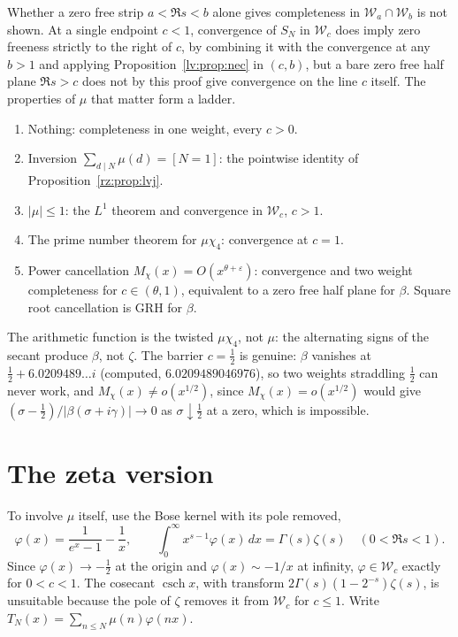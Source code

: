 Whether a zero free strip $a<\Re s<b$ alone gives completeness in $\mathcal W_a\cap\mathcal W_b$ is not shown. At a single endpoint $c<1$, convergence of $S_N$ in $\mathcal W_c$ does imply zero freeness strictly to the right of $c$, by combining it with the convergence at any $b>1$ and applying Proposition~\ref{lv:prop:nec} in $(c,b)$, but a bare zero free half plane $\Re s>c$ does not by this proof give convergence on the line $c$ itself. The properties of $\mu$ that matter form a ladder.
\begin{enumerate}
\item[(P0)] Nothing: completeness in one weight, every $c>0$.
\item[(P1)] Inversion $\sum_{d\mid N}\mu(d)=[N=1]$: the pointwise identity of Proposition~\ref{rz:prop:lvj}.
\item[(P2)] $|\mu|\le1$: the $L^1$ theorem and convergence in $\mathcal W_c$, $c>1$.
\item[(P3)] The prime number theorem for $\mu\chi_4$: convergence at $c=1$.
\item[(P4)] Power cancellation $M_\chi(x)=O(x^{\theta+\varepsilon})$: convergence and two weight completeness for $c\in(\theta,1)$, equivalent to a zero free half plane for $\beta$. Square root cancellation is GRH for $\beta$.
\end{enumerate}
The arithmetic function is the twisted $\mu\chi_4$, not $\mu$: the alternating signs of the secant produce $\beta$, not $\zeta$. The barrier $c=\frac12$ is genuine: $\beta$ vanishes at $\frac12+6.0209489\ldots i$ (computed, $6.0209489046976$), so two weights straddling $\frac12$ can never work, and $M_\chi(x)\ne o(x^{1/2})$, since $M_\chi(x)=o(x^{1/2})$ would give $(\sigma-\frac12)/|\beta(\sigma+i\gamma)|\to0$ as $\sigma\downarrow\frac12$ at a zero, which is impossible.

\section{The zeta version}\label{lv:sec:zeta}

To involve $\mu$ itself, use the Bose kernel with its pole removed,
\begin{equation}\label{lv:eq:phi}
\varphi(x)=\frac1{e^x-1}-\frac1x,\qquad\int_0^\infty x^{s-1}\varphi(x)\,dx=\Gamma(s)\zeta(s)\quad(0<\Re s<1).
\end{equation}
Since $\varphi(x)\to-\frac12$ at the origin and $\varphi(x)\sim-1/x$ at infinity, $\varphi\in\mathcal W_c$ exactly for $0<c<1$. The cosecant $\operatorname{csch}x$, with transform $2\Gamma(s)(1-2^{-s})\zeta(s)$, is unsuitable because the pole of $\zeta$ removes it from $\mathcal W_c$ for $c\le1$. Write $T_N(x)=\sum_{n\le N}\mu(n)\varphi(nx)$.

